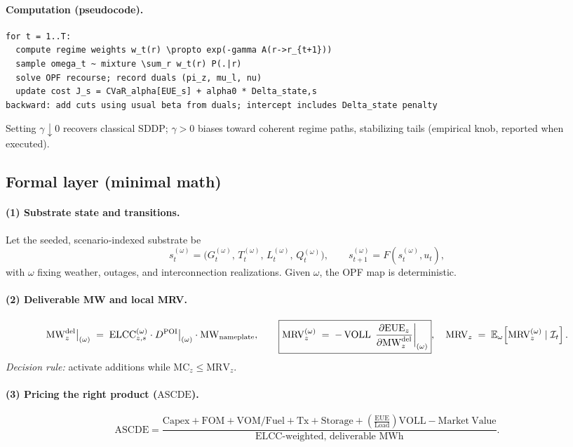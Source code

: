 \documentclass[11pt]{article}
\newcommand{\ELCC}{\ensuremath{\mathrm{ELCC}}}
\newcommand{\VOLL}{\ensuremath{\mathrm{VOLL}}}
\newcommand{\EUE}{\ensuremath{\mathrm{EUE}}}
\newcommand{\ASCDE}{\ensuremath{\mathrm{ASCDE}}}
\newcommand{\MRV}{\ensuremath{\mathrm{MRV}}}
\newcommand{\MC}{\ensuremath{\mathrm{MC}}}
\numberwithin{equation}{section}
\theoremstyle{definition}
\theoremstyle{remark}
\begin{document}
\paragraph{Computation (pseudocode).}
\begin{lstlisting}[style=annexpseudo,caption={Quantum-inspired regime reweighting},label={lst:qsd}]
for t = 1..T:
  compute regime weights w_t(r) \propto exp(-gamma A(r->r_{t+1}))
  sample omega_t ~ mixture \sum_r w_t(r) P(.|r)
  solve OPF recourse; record duals (pi_z, mu_l, nu)
  update cost J_s = CVaR_alpha[EUE_s] + alpha0 * Delta_state,s
backward: add cuts using usual beta from duals; intercept includes Delta_state penalty
\end{lstlisting}
Setting $\gamma\!\downarrow\!0$ recovers classical SDDP; $\gamma\!>\!0$ biases toward coherent regime paths, stabilizing tails (empirical knob, reported when executed).

\subsection{Formal layer (minimal math)}
\paragraph{(1) Substrate state and transitions.}
Let the seeded, scenario‑indexed substrate be
\[
  s_t^{(\omega)}=\big(G_t^{(\omega)},\,T_t^{(\omega)},\,L_t^{(\omega)},\,Q_t^{(\omega)}\big),\qquad
  s_{t+1}^{(\omega)} = F\!\left(s_t^{(\omega)}, u_t\right),
\]
with \(\omega\) fixing weather, outages, and interconnection realizations. Given \(\omega\), the OPF map is deterministic.

\paragraph{(2) Deliverable MW and local MRV.}
\[
  \MWdel[z]\big|_{(\omega)}
  \;=\;
  \ELCC_{z,s}^{(\omega)} \cdot \Ddel\big|_{(\omega)} \cdot \mathrm{MW}_{\text{nameplate}},
  \qquad
  \boxed{%
    \MRV_{z}^{(\omega)}
    \;=\;
    -\,\VOLL\,
    \left.\frac{\partial \EUE_{z}}{\partial \MWdel[z]}\right|_{(\omega)}
  },
  \quad
  \MRV_{z}
  \;=\;
  \mathbb{E}_{\omega}\!\left[\MRV_{z}^{(\omega)} \mid \mathcal{I}_{t}\right].
\]
\emph{Decision rule:} activate additions while $\MC_{z}\le \MRV_{z}$.

\paragraph{(3) Pricing the right product (\ASCDE).}
\[
  \ASCDE=\frac{\mathrm{Capex}+\mathrm{FOM}+\mathrm{VOM/Fuel}+\mathrm{Tx}+\mathrm{Storage}
  +\left(\frac{\EUE}{\mathrm{Load}}\right)\VOLL-\mathrm{Market\ Value}}
  {\text{ELCC-weighted, deliverable MWh}}.
\]
\end{document}
